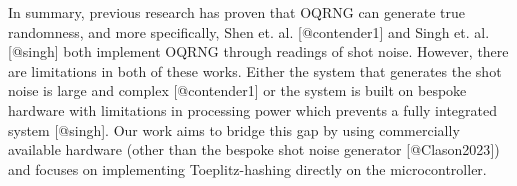 \documentclass{sigchi}
\begin{document}
In summary, previous research has proven that OQRNG can generate true
randomness, and more specifically, Shen et. al. {[}@contender1{]} and
Singh et. al. {[}@singh{]} both implement OQRNG through readings of shot
noise. However, there are limitations in both of these works. Either the
system that generates the shot noise is large and complex
{[}@contender1{]} or the system is built on bespoke hardware with
limitations in processing power which prevents a fully integrated system
{[}@singh{]}. Our work aims to bridge this gap by using commercially
available hardware (other than the bespoke shot noise generator
{[}@Clason2023{]}) and focuses on implementing Toeplitz-hashing directly
on the microcontroller.

\pagebreak
\balance{}



\end{document}

